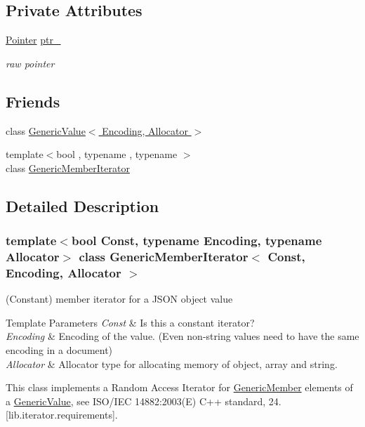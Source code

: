 \subsection*{Private Attributes}
\begin{DoxyCompactItemize}
\item 
\hyperlink{classGenericMemberIterator_ac0bd6e77617593892fc13afb00e62f29}{Pointer} \hyperlink{classGenericMemberIterator_a86d045bb193c966d92655a73fe813548}{ptr\+\_\+}
\begin{DoxyCompactList}\small\item\em raw pointer \end{DoxyCompactList}\end{DoxyCompactItemize}
\subsection*{Friends}
\begin{DoxyCompactItemize}
\item 
class \hyperlink{classGenericMemberIterator_a82bdd5798f1a5ac0e3e7ba4bd6938cfc}{Generic\+Value$<$ Encoding, Allocator $>$}
\item 
{\footnotesize template$<$bool , typename , typename $>$ }\\class \hyperlink{classGenericMemberIterator_aa375aeb1ffac85cddc3a72a6c24ec6e1}{Generic\+Member\+Iterator}
\end{DoxyCompactItemize}


\subsection{Detailed Description}
\subsubsection*{template$<$bool Const, typename Encoding, typename Allocator$>$\newline
class Generic\+Member\+Iterator$<$ Const, Encoding, Allocator $>$}

(Constant) member iterator for a J\+S\+ON object value 


\begin{DoxyTemplParams}{Template Parameters}
{\em Const} & Is this a constant iterator? \\
\hline
{\em Encoding} & Encoding of the value. (Even non-\/string values need to have the same encoding in a document) \\
\hline
{\em Allocator} & Allocator type for allocating memory of object, array and string.\\
\hline
\end{DoxyTemplParams}
This class implements a Random Access Iterator for \hyperlink{classGenericMember}{Generic\+Member} elements of a \hyperlink{classGenericValue}{Generic\+Value}, see I\+S\+O/\+I\+EC 14882\+:2003(E) C++ standard, 24. \mbox{[}lib.\+iterator.\+requirements\mbox{]}.

